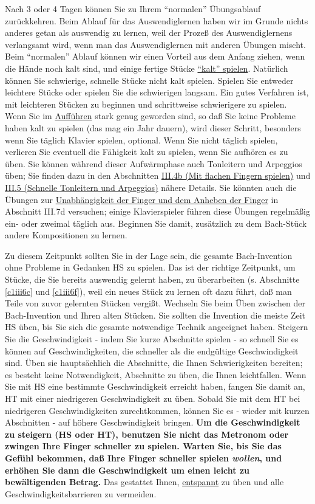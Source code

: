 Nach 3 oder 4 Tagen können Sie zu Ihrem \enquote{normalen} Übungsablauf zurückkehren.
Beim Ablauf für das Auswendiglernen haben wir im Grunde nichts anderes getan als auswendig zu lernen, weil der Prozeß des Auswendiglernens verlangsamt wird, wenn man das Auswendiglernen mit anderen Übungen mischt.
Beim \enquote{normalen} Ablauf können wir einen Vorteil aus dem Anfang ziehen, wenn die Hände noch kalt sind, und einige fertige Stücke \hyperref[c1iii6g]{\enquote{kalt} spielen}.
Natürlich können Sie schwierige, schnelle Stücke nicht kalt spielen.
Spielen Sie entweder leichtere Stücke oder spielen Sie die schwierigen langsam.
Ein gutes Verfahren ist, mit leichteren Stücken zu beginnen und schrittweise schwierigere zu spielen.
Wenn Sie im \hyperref[c1iii14]{Aufführen} stark genug geworden sind, so daß Sie keine Probleme haben kalt zu spielen (das mag ein Jahr dauern), wird dieser Schritt, besonders wenn Sie täglich Klavier spielen, optional.
Wenn Sie nicht täglich spielen, verlieren Sie eventuell die Fähigkeit kalt zu spielen, wenn Sie aufhören es zu üben.
Sie können während dieser Aufwärmphase auch Tonleitern und Arpeggios üben; Sie finden dazu in den Abschnitten \hyperref[c1iii4b]{III.4b (Mit flachen Fingern spielen)} und \hyperref[c1iii5]{III.5 (Schnelle Tonleitern und Arpeggios)} nähere Details.
Sie könnten auch die Übungen zur \hyperref[c1iii7d]{Unabhängigkeit der Finger und dem Anheben der Finger} in Abschnitt III.7d versuchen; einige Klavierspieler führen diese Übungen regelmäßig ein- oder zweimal täglich aus.
Beginnen Sie damit, zusätzlich zu dem Bach-Stück andere Kompositionen zu lernen.

Zu diesem Zeitpunkt sollten Sie in der Lage sein, die gesamte Bach-Invention ohne Probleme in Gedanken HS zu spielen.
Das ist der richtige Zeitpunkt, um Stücke, die Sie bereits auswendig gelernt haben, zu überarbeiten (s. Abschnitte \hyperref[c1iii6c]{\autoref{c1iii6c}} und \hyperref[c1iii6f]{\autoref{c1iii6f}}), weil ein neues Stück zu lernen oft dazu führt, daß man Teile von zuvor gelernten Stücken vergißt.
Wechseln Sie beim Üben zwischen der Bach-Invention und Ihren alten Stücken.
Sie sollten die Invention die meiste Zeit HS üben, bis Sie sich die gesamte notwendige Technik angeeignet haben.
Steigern Sie die Geschwindigkeit - indem Sie kurze Abschnitte spielen - so schnell Sie es können auf Geschwindigkeiten, die schneller als die endgültige Geschwindigkeit sind.
Üben sie hauptsächlich die Abschnitte, die Ihnen Schwierigkeiten bereiten; es besteht keine Notwendigkeit, Abschnitte zu üben, die Ihnen leichtfallen.
Wenn Sie mit HS eine bestimmte Geschwindigkeit erreicht haben, fangen Sie damit an, HT mit einer niedrigeren Geschwindigkeit zu üben.
Sobald Sie mit dem HT bei niedrigeren Geschwindigkeiten zurechtkommen, können Sie es - wieder mit kurzen Abschnitten - auf höhere Geschwindigkeit bringen.
\textbf{Um die Geschwindigkeit zu steigern (HS oder HT), benutzen Sie nicht das Metronom oder zwingen Ihre Finger schneller zu spielen. Warten Sie, bis Sie das Gefühl bekommen, daß Ihre Finger schneller spielen \textit{wollen}, und erhöhen Sie dann die Geschwindigkeit um einen leicht zu bewältigenden Betrag.}
Das gestattet Ihnen, \hyperref[c1ii14]{entspannt} zu üben und alle Geschwindigkeitsbarrieren zu vermeiden.

